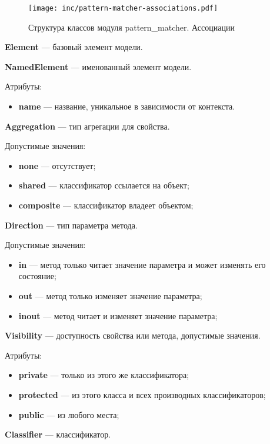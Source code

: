 \begin{figure}[!ht]
\centering
\texttt{[image: inc/pattern-matcher-associations.pdf]}
\caption{Структура классов модуля pattern\_matcher. Ассоциации}
\label{fig:pattern-matcher-associations}
\end{figure}

\textbf{Element} --- базовый элемент модели.

\textbf{NamedElement} --- именованный элемент модели.

Атрибуты:
\begin{itemize}
\item \textbf{name} --- название, уникальное в зависимости от контекста.
\end{itemize}

\textbf{Aggregation} --- тип агрегации для свойства.

Допустимые значения:
\begin{itemize}
\item \textbf{none} --- отсутствует;
\item \textbf{shared} --- классификатор ссылается на объект;
\item \textbf{composite} --- классификатор владеет объектом;
\end{itemize}

\textbf{Direction} --- тип параметра метода.

Допустимые значения:
\begin{itemize}
\item \textbf{in} --- метод только читает значение параметра и может изменять его состояние;
\item \textbf{out} --- метод только изменяет значение параметра;
\item \textbf{inout} --- метод читает и изменяет значение параметра;
\end{itemize}

\textbf{Visibility} --- доступность свойства или метода, допустимые значения.

Атрибуты:
\begin{itemize}
\item \textbf{private} --- только из этого же классификатора;
\item \textbf{protected} --- из этого класса и всех производных классификаторов;
\item \textbf{public} --- из любого места;
\end{itemize}

\textbf{Classifier} --- классификатор.

